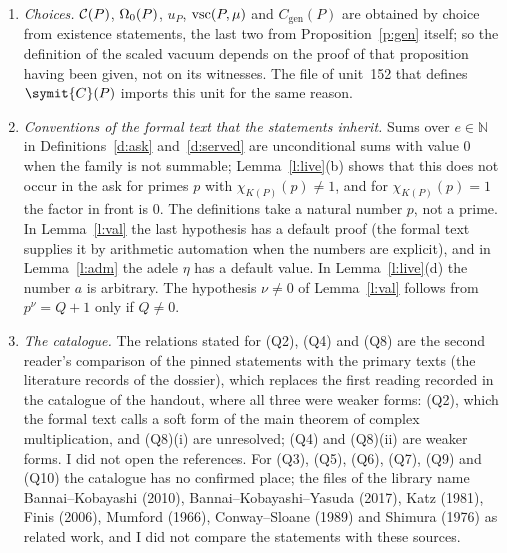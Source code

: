 \documentclass[11pt,a4paper]{article}
\theoremstyle{plainx}
\theoremstyle{uprightx}
\newcommand{\NN}{\mathbb{N}}
\newcommand{\KP}[1]{K(#1)}
\newcommand{\chiK}[1]{\chi_{\KP{#1}}}
\newcommand{\cP}[1]{\symit{C}(#1)}
\newcommand{\Cgen}[1]{C_{\mathrm{gen}}(#1)}
\begin{document}
\begin{enumerate}[label=\textup{\arabic*.},leftmargin=1.6em,itemsep=5pt]
the lemma of unit~152 that compares logarithmic sizes. I state them as I read them at the places of use; the
second half of (S2) is my summary of a short chain there, which uses $4\le p$ (available because $p\ge13$) and
is false for $p=2$.
\item \emph{Choices.} $\mathcal{C}(P)$, $\Omega_0(P)$, $u_P$, $\mathrm{vsc}(P,\mu)$ and $\Cgen{P}$ are obtained by choice from existence
statements, the last two from Proposition~\ref{p:gen} itself; so the definition of the scaled vacuum depends on the
proof of that proposition having been given, not on its witnesses. The file of unit~152 that defines $\cP{P}$
imports this unit for the same reason.
\item \emph{Conventions of the formal text that the statements inherit.} Sums over $e\in\NN$ in
Definitions~\ref{d:ask} and~\ref{d:served} are unconditional sums with value $0$ when the family is not summable;
Lemma~\ref{l:live}(b) shows that this does not occur in the ask for primes $p$ with $\chiK{P}(p)\ne1$, and for
$\chiK{P}(p)=1$ the factor in front is $0$. The definitions take a natural number $p$, not a prime. In
Lemma~\ref{l:val} the last hypothesis has a default proof (the formal text supplies it by arithmetic automation
when the numbers are explicit), and in Lemma~\ref{l:adm} the adele $\eta$ has a default value. In
Lemma~\ref{l:live}(d) the number $a$ is arbitrary. The hypothesis $\nu\ne0$ of Lemma~\ref{l:val} follows from
$p^\nu=Q+1$ only if $Q\ne0$.
\item \emph{The catalogue.} The relations stated for (Q2), (Q4) and (Q8) are the second reader's comparison of the
pinned statements with the primary texts (the literature records of the dossier), which replaces the first
reading recorded in the catalogue of the handout, where all three were weaker forms: (Q2), which the formal text
calls a soft form of the main theorem of complex multiplication, and (Q8)(i) are unresolved; (Q4) and (Q8)(ii)
are weaker forms. I did not open the references. For (Q3), (Q5),
(Q6), (Q7), (Q9) and (Q10) the catalogue has no confirmed place; the files of the library name Bannai--Kobayashi
(2010), Bannai--Kobayashi--Yasuda (2017), Katz (1981), Finis (2006), Mumford (1966), Conway--Sloane (1989) and
Shimura (1976) as related work, and I did not compare the statements with these sources.
\end{enumerate}
\end{document}
